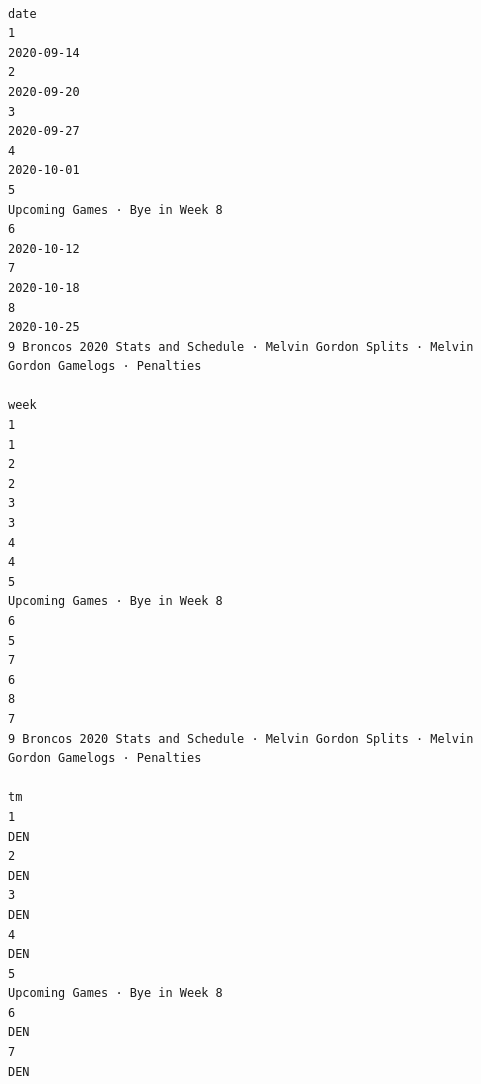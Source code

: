 \documentclass[
]{article}
\begin{document}
\begin{verbatim}
                                                                                         date
1                                                                                  2020-09-14
2                                                                                  2020-09-20
3                                                                                  2020-09-27
4                                                                                  2020-10-01
5                                                              Upcoming Games · Bye in Week 8
6                                                                                  2020-10-12
7                                                                                  2020-10-18
8                                                                                  2020-10-25
9 Broncos 2020 Stats and Schedule · Melvin Gordon Splits · Melvin Gordon Gamelogs · Penalties
                                                                                         week
1                                                                                           1
2                                                                                           2
3                                                                                           3
4                                                                                           4
5                                                              Upcoming Games · Bye in Week 8
6                                                                                           5
7                                                                                           6
8                                                                                           7
9 Broncos 2020 Stats and Schedule · Melvin Gordon Splits · Melvin Gordon Gamelogs · Penalties
                                                                                           tm
1                                                                                         DEN
2                                                                                         DEN
3                                                                                         DEN
4                                                                                         DEN
5                                                              Upcoming Games · Bye in Week 8
6                                                                                         DEN
7                                                                                         DEN

\end{verbatim}
\end{document}
